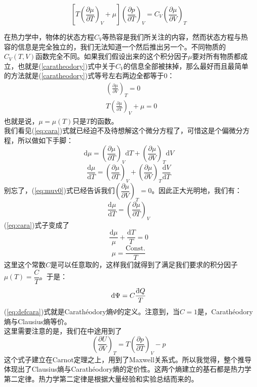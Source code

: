 \documentclass[UTF8]{ctexart}
\newcommand{\dbar}{\mathrm{\mathchar'26\mkern-9mu d}}
\newcommand{\md}{\mathrm{d}}
\numberwithin{equation}{subsection}
\begin{document}
\begin{equation}\label{caratheodory}
\left[T\left(\frac{\partial \mu}{\partial T}\right)_{V}+\mu\right]\left(\frac{\partial p}{\partial T}\right)_{V}=C_V\left(\frac{\partial \mu}{\partial V}\right)_{T}
\end{equation}

在热力学中，物体的状态方程$C_V$等热容是我们所关注的内容，然而状态方程与热容的信息是完全独立的，我们无法知道一个然后推出另一个。不同物质的$C_V(T,V)$函数完全不同。如果我们假设出来的这个积分因子$\mu$要对所有物质都成立，也就是(\ref{caratheodory})式中关于$C_V$的信息全部被抹掉，那么最好而且最简单的方法就是(\ref{caratheodory})式等号左右两边全都等于0：
\begin{align}
\label{eq:muv0}&\left(\frac{\partial \mu}{\partial V}\right)_{T}=0\\
\label{eq:cara}&T\left(\frac{\partial \mu}{\partial T}\right)_{V}+\mu=0
\end{align}
也就是说，$\mu=\mu(T)$只是$T$的函数。\\
我们看见(\ref{eq:cara})式就已经迫不及待想解这个微分方程了，可惜这是个偏微分方程，所以做如下手脚：
\[ \md\mu=\left(\frac{\partial \mu}{\partial T}\right)_{V}\md T+\left(\frac{\partial \mu}{\partial V}\right)_{T}\md V \]
\[ \frac{\md\mu}{\md T}=\left(\frac{\partial \mu}{\partial T}\right)_{V}+\left(\frac{\partial \mu}{\partial V}\right)_{T}\frac{\md V}{\md T}\]
别忘了，(\ref{eq:muv0})式已经告诉我们$\left(\dfrac{\partial \mu}{\partial V}\right)_{T}=0$。因此正大光明地，我们有：
\[ \frac{\md\mu}{\md T}=\left(\frac{\partial \mu}{\partial T}\right)_{V}\]
(\ref{eq:cara})式子变成了
\[ \frac{\md\mu}{\mu}+\frac{\md T}{T}=0 \]
\[ \mu =\frac{\text{Const.}}{T} \]
这里这个常数$C$是可以任意取的，这样我们就得到了满足我们要求的积分因子$\mu(T)=\dfrac{C}{T}$。于是：
\begin{equation}\label{eq:defcara}
\md \Psi=C\frac{\dbar Q}{T}
\end{equation}
(\ref{eq:defcara})式就是Carath\'{e}odory熵$\Psi$的定义。注意到，当$C=1$是，Carath\'{e}odory熵与Clausius熵等价。\\

这里需要注意的是，我们在中途用到了
\begin{equation*}         
\left(\dfrac{\partial U}{\partial V}\right)_{T}=T\left(\dfrac{\partial p}{\partial T}\right)_{V}-p
\end{equation*}
这个式子建立在Carnot定理之上，用到了Maxwell关系式。所以我觉得，整个推导体现出了Clausius熵与Carath\'{e}odory熵的定价性。这两个熵建立的基石都是热力学第二定律。热力学第二定律是根据大量经验和实验总结而来的。
\end{document}
